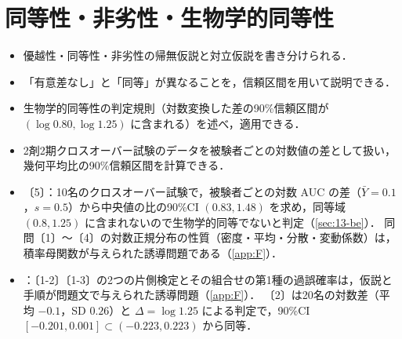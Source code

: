 \chapter{同等性・非劣性・生物学的同等性}\label{ch:13}

\begin{goalbox}
\begin{itemize}
\item 優越性・同等性・非劣性の帰無仮説と対立仮説を書き分けられる．
\item 「有意差なし」と「同等」が異なることを，信頼区間を用いて説明できる．
\item 生物学的同等性の判定規則（対数変換した差の90\%信頼区間が $(\log0.80,\log1.25)$ に含まれる）を述べ，適用できる．
\item 2剤2期クロスオーバー試験のデータを被験者ごとの対数値の差として扱い，幾何平均比の90\%信頼区間を計算できる．
\end{itemize}
\end{goalbox}

\begin{exambox}
\begin{itemize}
\item {}〔5〕：10名のクロスオーバー試験で，被験者ごとの対数 AUC の差（$\bar Y=0.1$，$s=0.5$）から中央値の比の90\%CI $(0.83,1.48)$ を求め，同等域 $(0.8,1.25)$ に含まれないので生物学的同等でないと判定（\cref{sec:13-be}）．
      同問〔1〕〜〔4〕の対数正規分布の性質（密度・平均・分散・変動係数）は，積率母関数が与えられた誘導問題である（\cref{app:F}）．
\item {}：〔1-2〕〔1-3〕の2つの片側検定とその組合せの第1種の過誤確率は，仮説と手順が問題文で与えられた誘導問題（\cref{app:F}）．
      〔2〕は20名の対数差（平均 $-0.1$，SD $0.26$）と $\Delta=\log1.25$ による判定で，90\%CI $[-0.201,0.001]\subset(-0.223,0.223)$ から同等．
\end{itemize}
\end{exambox}


